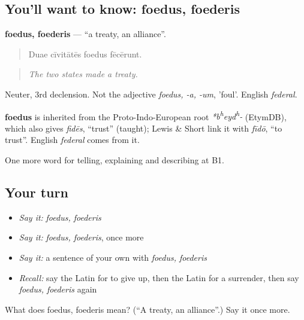 \subsection*{You'll want to know: foedus, foederis}
\textbf{foedus, foederis} — \textquotedblleft{}a treaty, an alliance\textquotedblright{}.

\begin{quote}
Duae cīvitātēs foedus fēcērunt.
\end{quote}

\begin{quote}
\emph{The two states made a treaty.}
\end{quote}

Neuter, 3rd declension. Not the adjective \emph{foedus, -a, -um}, 'foul'. English \emph{federal}.

\begin{cousinweb}
\textbf{foedus} is inherited from the Proto-Indo-European root \emph{*b\textsuperscript{h}eyd\textsuperscript{h}-} (EtymDB), which also gives \emph{fidēs}, \textquotedblleft{}trust\textquotedblright{} (taught); Lewis \& Short link it with \emph{fīdō}, \textquotedblleft{}to trust\textquotedblright{}. English \emph{federal} comes from it.
\end{cousinweb}

\begin{grammarlens}[title={What you've built}]
One more word for telling, explaining and describing at B1.
\end{grammarlens}

\subsection*{Your turn}
\begin{itemize}
\raggedright
  \item \emph{Say it:} \emph{foedus, foederis}
  \item \emph{Say it:} \emph{foedus, foederis}, once more
  \item \emph{Say it:} a sentence of your own with \emph{foedus, foederis}
  \item \emph{Recall:} say the Latin for to give up, then the Latin for a surrender, then say \emph{foedus, foederis} again
\end{itemize}

\begin{tcolorbox}[breakable,colback=teal!4,colframe=teal!35!black,title={Before you move on}]
What does foedus, foederis mean? (\textquotedblleft{}A treaty, an alliance\textquotedblright{}.) Say it once more.
\end{tcolorbox}
